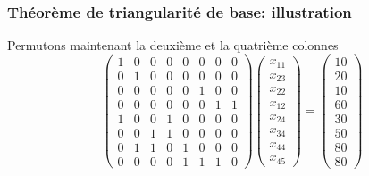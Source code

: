 \documentclass[usepdftitle=false]{beamer}
\begin{document}
\begin{frame}
\frametitle{Théorème de triangularité de base: illustration}

Permutons maintenant la deuxième et la quatrième colonnes
\[
\begin{pmatrix}
 1 & 0 & 0 & 0 & 0 & 0 & 0 & 0 \\
 0 & 1 & 0 & 0 & 0 & 0 & 0 & 0 \\
 0 & 0 & 0 & 0 & 0 & 1 & 0 & 0 \\
 0 & 0 & 0 & 0 & 0 & 0 & 1 & 1 \\
 1 & 0 & 0 & 1 & 0 & 0 & 0 & 0 \\
 0 & 0 & 1 & 1 & 0 & 0 & 0 & 0 \\
 0 & 1 & 1 & 0 & 1 & 0 & 0 & 0 \\
 0 & 0 & 0 & 0 & 1 & 1 & 1 & 0
\end{pmatrix}
\begin{pmatrix}
x_{11} \\
x_{23} \\
x_{22} \\
x_{12} \\
x_{24} \\
x_{34} \\
x_{44} \\
x_{45}
\end{pmatrix}
=
\begin{pmatrix}
10 \\
20 \\
10 \\
60 \\
30 \\
50 \\
80 \\
80
\end{pmatrix}
\]

\end{frame}
\end{document}
